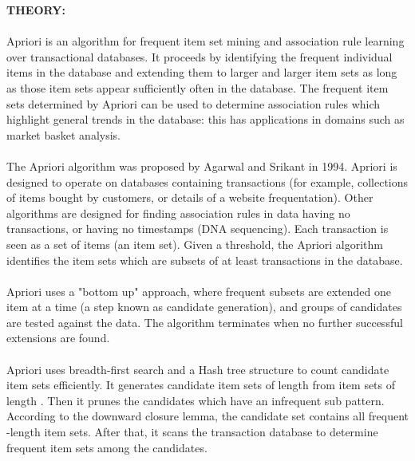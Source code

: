 \documentclass[11pt]{article}
\begin{document}
	\noindent \textbf{THEORY:} \\
	\paragraph{}
	Apriori is an algorithm for frequent item set mining and association rule learning over
	transactional databases. It proceeds by identifying the frequent individual items in the database
	and extending them to larger and larger item sets as long as those item sets appear sufficiently
	often in the database. The frequent item sets determined by Apriori can be used to
	determine association rules which highlight general trends in the database: this has applications
	in domains such as market basket analysis.
	\paragraph{}
	The Apriori algorithm was proposed by Agarwal and Srikant in 1994. Apriori is designed to
	operate on databases containing transactions (for example, collections of items bought by
	customers, or details of a website frequentation). Other algorithms are designed for finding
	association rules in data having no transactions, or having no timestamps (DNA sequencing).
	Each transaction is seen as a set of items (an item set). Given a threshold, the Apriori algorithm
	identifies the item sets which are subsets of at least transactions in the database.
	\paragraph{}
	Apriori uses a "bottom up" approach, where frequent subsets are extended one item at a time (a
	step known as candidate generation), and groups of candidates are tested against the data. The
	algorithm terminates when no further successful extensions are found.
	\paragraph{}
	Apriori uses breadth-first search and a Hash tree structure to count candidate item sets
	efficiently. It generates candidate item sets of length from item sets of length . Then it prunes the
	candidates which have an infrequent sub pattern. According to the downward closure lemma, the
	candidate set contains all frequent -length item sets. After that, it scans the transaction database
	to determine frequent item sets among the candidates.
	
\end{document}
